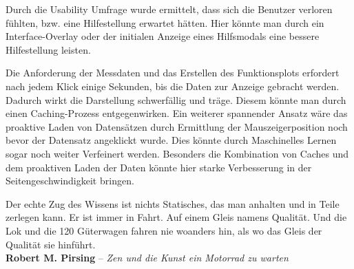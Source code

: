 Durch die Usability Umfrage wurde ermittelt, dass sich die Benutzer verloren fühlten, bzw. eine Hilfestellung erwartet hätten. Hier könnte man durch ein Interface-Overlay oder der initialen Anzeige eines Hilfsmodals eine bessere Hilfestellung leisten.

Die Anforderung der Messdaten und das Erstellen des Funktionsplots erfordert nach jedem Klick einige Sekunden, bis die Daten zur Anzeige gebracht werden. Dadurch wirkt die Darstellung schwerfällig und träge. Diesem könnte man durch einen Caching-Prozess entgegenwirken. Ein weiterer spannender Ansatz wäre das proaktive Laden von Datensätzen durch Ermittlung der Mauszeigerposition noch bevor der Datensatz angeklickt wurde. Dies könnte durch Maschinelles Lernen sogar noch weiter Verfeinert werden. Besonders die Kombination von Caches und dem proaktiven Laden der Daten könnte hier starke Verbesserung in der Seitengeschwindigkeit bringen. 



\newpage


\vspace*{\fill}\thispagestyle{plain}
Der echte Zug des Wissens ist nichts Statisches, das man anhalten und in Teile zerlegen kann. Er ist immer in Fahrt. Auf einem Gleis namens Qualität. Und die Lok und die 120 Güterwagen fahren nie woanders hin, als wo das Gleis der Qualität sie hinführt.
\\
\hrulefill \vspace{0.3cm}
\textbf{Robert M. Pirsing} -- \textit{Zen und die Kunst ein Motorrad zu warten}
\vspace*{\fill}
